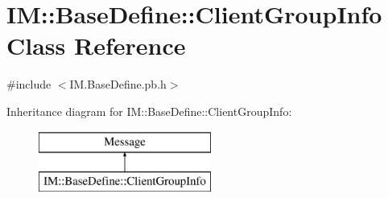 \hypertarget{class_i_m_1_1_base_define_1_1_client_group_info}{}\section{I\+M\+:\+:Base\+Define\+:\+:Client\+Group\+Info Class Reference}
\label{class_i_m_1_1_base_define_1_1_client_group_info}


{\ttfamily \#include $<$I\+M.\+Base\+Define.\+pb.\+h$>$}

Inheritance diagram for I\+M\+:\+:Base\+Define\+:\+:Client\+Group\+Info\+:\begin{figure}[H]
\begin{center}
\leavevmode
\includegraphics[height=2.000000cm]{class_i_m_1_1_base_define_1_1_client_group_info}
\end{center}
\end{figure}
